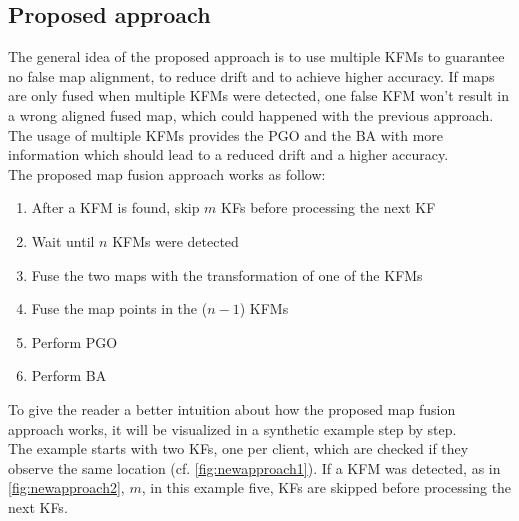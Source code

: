 \subsection{Proposed approach}
The general idea of the proposed approach is to use multiple \acp{KFM} to guarantee no false map alignment, to reduce drift and to achieve higher accuracy. If maps are only fused when multiple \acp{KFM} were detected, one false \ac{KFM} won't result in a wrong aligned fused map, which could happened with the previous approach. The usage of multiple \acp{KFM} provides the \ac{PGO} and the \ac{BA} with more information which should lead to a reduced drift and a higher accuracy.\\

The proposed map fusion approach works as follow:

\begin{enumerate}
  \item After a \ac{KFM} is found, skip $m$ \acp{KF} before processing the next \acs{KF}
  \item Wait until $n$ \acp{KFM} were detected
  \item Fuse the two maps with the transformation of one of the \acp{KFM}
  \item Fuse the map points in the ($n-1$) \acp{KFM}
  \item Perform \ac{PGO}
  \item Perform \ac{BA}
\end{enumerate}

To give the reader a better intuition about how the proposed map fusion approach works, it will be visualized in a synthetic example step by step.\\
The example starts with two \acp{KF}, one per client, which are checked if they observe the same location (cf. \autoref{fig:newapproach1}). If a \ac{KFM} was detected, as in \autoref{fig:newapproach2}, $m$, in this example five, \acp{KF} are skipped before processing the next \acp{KF}.

